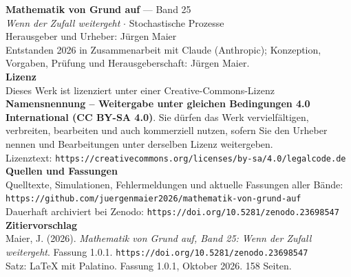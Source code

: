 \thispagestyle{empty}
\vspace*{\fill}
\begin{flushleft}
{\small\color{grau}
\textbf{\color{tief}Mathematik von Grund auf} --- Band 25\\[2pt]
\textit{Wenn der Zufall weitergeht} $\cdot$ Stochastische Prozesse\\[14pt]

Herausgeber und Urheber: Jürgen Maier\\[2pt]
Entstanden 2026 in Zusammenarbeit mit Claude (Anthropic); Konzeption, Vorgaben, Prüfung und Herausgeberschaft: Jürgen Maier.\\[14pt]

\textbf{Lizenz}\\[2pt]
Dieses Werk ist lizenziert unter einer Creative-Commons-Lizenz \textbf{Namensnennung -- Weitergabe unter gleichen Bedingungen 4.0 International (CC BY-SA 4.0)}. Sie dürfen das Werk vervielfältigen, verbreiten, bearbeiten und auch kommerziell nutzen, sofern Sie den Urheber nennen und Bearbeitungen unter derselben Lizenz weitergeben.\\[2pt]
Lizenztext: \texttt{https://creativecommons.org/licenses/by-sa/4.0/legalcode.de}\\[14pt]

\textbf{Quellen und Fassungen}\\[2pt]
Quelltexte, Simulationen, Fehlermeldungen und aktuelle Fassungen aller Bände:\\
\texttt{https://github.com/juergenmaier2026/mathematik-von-grund-auf}\\[2pt]
Dauerhaft archiviert bei Zenodo: \texttt{https://doi.org/10.5281/zenodo.23698547}\\[14pt]

\textbf{Zitiervorschlag}\\[2pt]
Maier, J. (2026). \textit{Mathematik von Grund auf, Band 25: Wenn der Zufall weitergeht}. Fassung 1.0.1. \texttt{https://doi.org/10.5281/zenodo.23698547}\\[14pt]

Satz: \LaTeX{} mit Palatino. Fassung 1.0.1, Oktober 2026. 158 Seiten.
}
\end{flushleft}
\vspace*{1.5cm}
